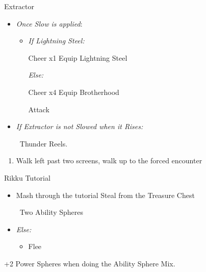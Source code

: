 \begin{battle}[4000]{Extractor}
    \begin{itemize}
        \tidusf Haste self
        \wakkaf If anyone is below 216 HP Hi-Potion them, otherwise Attack
        \tidusf Attack Extractor until you apply Slow (turn order will show \wakka\ 2 turns, \tidus\ 3 turns per \enemy\ turn)
        \item \textit{Once Slow is applied}:
        \begin{itemize}
            \tidusf Haste Wakka
            \item \textit{If Lightning Steel:}
            \begin{itemize}
                \tidusf Cheer x1
                \tidusf Equip Lightning Steel
            \end{itemize}
            \textit{Else:}
            \begin{itemize}
                \tidusf Cheer x4
                \tidusf Equip Brotherhood
            \end{itemize}
            \tidusf Attack
        \end{itemize}
        \item \textit{If Extractor is not Slowed when it Rises:}
        \begin{itemize}
            \wakkaf \od\ Thunder Reels.
        \end{itemize}
    \end{itemize}
\end{battle}
\begin{enumerate}[resume]
    \item Walk left past two screens, walk up to the forced encounter
\end{enumerate}
\begin{battle}{Rikku Tutorial}
    \begin{itemize}
        \item Mash through the tutorial
        \rikkuf Steal from the Treasure Chest
        \begin{itemize}
            \rikkuf \od\ Two Ability Spheres
        \end{itemize}
        \item \textit{Else:}
        \begin{itemize}
            \rikkuf \od\ Two Potions or Hi-Potions
            \rikkuf Defend
            \item Flee
        \end{itemize}
    \end{itemize}
    +2 Power Spheres when doing the Ability Sphere Mix.
\end{battle}
